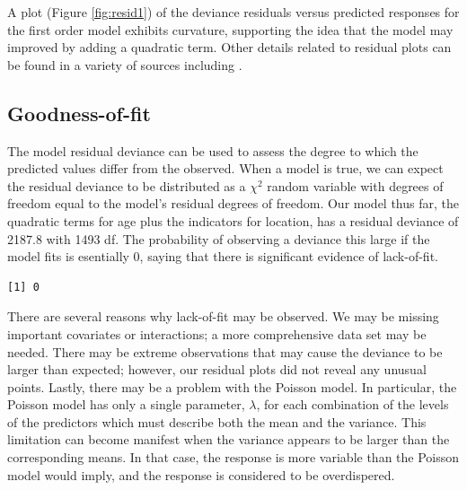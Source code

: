 \documentclass[
]{krantz}
\newenvironment{Shaded}{\begin{snugshade}}{\end{snugshade}}
\newcommand{\CommentTok}[1]{\textcolor[rgb]{0.37,0.37,0.37}{\textit{#1}}}
\newcommand{\DecValTok}[1]{\textcolor[rgb]{0.06,0.06,0.06}{#1}}
\newcommand{\KeywordTok}[1]{\textcolor[rgb]{0.27,0.27,0.27}{\textbf{#1}}}
\newcommand{\NormalTok}[1]{#1}
\newcommand{\OperatorTok}[1]{\textcolor[rgb]{0.43,0.43,0.43}{\textbf{#1}}}
\begin{document}
A plot (Figure \ref{fig:resid1}) of the deviance residuals versus predicted responses for the first order model exhibits curvature, supporting the idea that the model may improved by adding a quadratic term. Other details related to residual plots can be found in a variety of sources including \citet{McCullagh1989}.

\hypertarget{sec-PoisGOF}{%
\subsection{Goodness-of-fit}\label{sec-PoisGOF}}

The model residual deviance can be used to assess the degree to which the predicted values differ from the observed. When a model is true, we can expect the residual deviance to be distributed as a \(\chi^2\) random variable with degrees of freedom equal to the model's residual degrees of freedom. Our model thus far, the quadratic terms for age plus the indicators for location, has a residual deviance of 2187.8 with 1493 df. The probability of observing a deviance this large if the model fits is esentially 0, saying that there is significant evidence of lack-of-fit.

\begin{Shaded}
\end{Shaded}

\begin{verbatim}
[1] 0
\end{verbatim}

There are several reasons why lack-of-fit may be observed. We may be missing important covariates or interactions; a more comprehensive data set may be needed. There may be extreme observations that may cause the deviance to be larger than expected; however, our residual plots did not reveal any unusual points. Lastly, there may be a problem with the Poisson model. In particular, the Poisson model has only a single parameter, \(\lambda\), for each combination of the levels of the predictors which must describe both the mean and the variance. This limitation can become manifest when the variance appears to be larger than the corresponding means. In that case, the response is more variable than the Poisson model would imply, and the response is considered to be overdispered.
\end{document}

